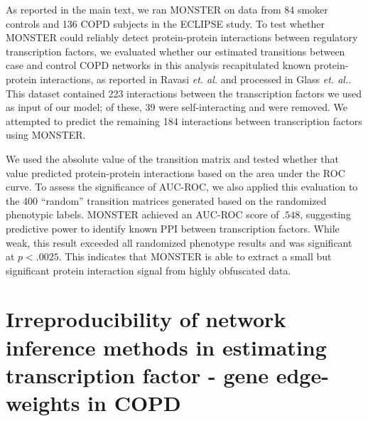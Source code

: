 As reported in the main text, we ran MONSTER on data from 84 smoker controls and 136 COPD subjects in the ECLIPSE study. To test whether MONSTER could reliably detect protein-protein interactions between regulatory transcription factors, we evaluated whether our estimated transitions between case and control COPD networks in this analysis recapitulated known protein-protein interactions, as reported in Ravasi \emph{et. al.}\cite{ravasi2010atlas} and processed in Glass \emph{et. al.}\cite{glass2015network}. This dataset contained 223 interactions between the transcription factors we used as input of our model; of these, 39 were self-interacting and were removed. We attempted to predict the remaining 184 interactions between transcription factors using MONSTER. 

We used the absolute value of the transition matrix and tested whether that value predicted protein-protein interactions based on the area under the ROC curve. To assess the significance of AUC-ROC, we also applied this evaluation to the 400 ``random'' transition matrices generated based on the randomized phenotypic labels. MONSTER achieved  an AUC-ROC score of $.548$, suggesting predictive power to identify known PPI between transcription factors. While weak, this result exceeded all randomized phenotype results and was significant at $p<.0025$. This indicates that MONSTER is able to extract a small but significant protein interaction signal from highly obfuscated data.

\section*{Irreproducibility of network inference methods in estimating transcription factor - gene edge-weights in COPD}


